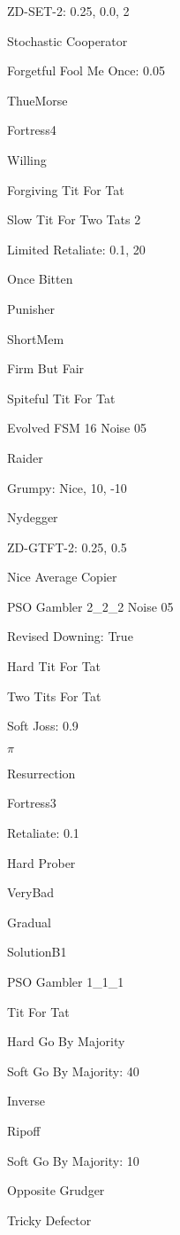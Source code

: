 \item ZD-SET-2: 0.25, 0.0, 2
\item Stochastic Cooperator
\item Forgetful Fool Me Once: 0.05
\item ThueMorse
\item Fortress4
\item Willing
\item Forgiving Tit For Tat
\item Slow Tit For Two Tats 2
\item Limited Retaliate: 0.1, 20
\item Once Bitten
\item Punisher
\item ShortMem
\item Firm But Fair
\item Spiteful Tit For Tat
\item Evolved FSM 16 Noise 05
\item Raider
\item Grumpy: Nice, 10, -10
\item Nydegger
\item ZD-GTFT-2: 0.25, 0.5
\item Nice Average Copier
\item PSO Gambler 2\_2\_2 Noise 05
\item Revised Downing: True
\item Hard Tit For Tat
\item Two Tits For Tat
\item Soft Joss: 0.9
\item $\pi$
\item Resurrection
\item Fortress3
\item Retaliate: 0.1
\item Hard Prober
\item VeryBad
\item Gradual
\item SolutionB1
\item PSO Gambler 1\_1\_1
\item Tit For Tat
\item Hard Go By Majority
\item Soft Go By Majority: 40
\item Inverse
\item Ripoff
\item Soft Go By Majority: 10
\item Opposite Grudger
\item Tricky Defector
